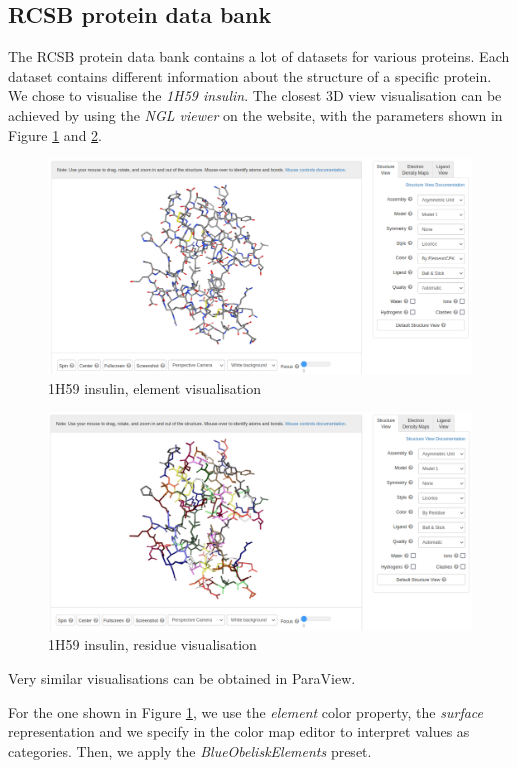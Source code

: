 \documentclass[openany]{article}
\begin{document}
\subsection {RCSB protein data bank}

The RCSB protein data bank contains a lot of datasets for various proteins. Each dataset contains different information about the structure of a specific protein. We chose to visualise the \textit{1H59 insulin}. The closest 3D view visualisation can be achieved by using the \textit{NGL viewer} on the website, with the parameters shown in Figure \ref{insulin_el} and \ref{insulin_res}.

\begin{figure} [h!]
	\centering
	\includegraphics[width=0.8\linewidth]{Proteins/1h59_insulin_el}
	\caption{1H59 insulin, element visualisation}
	\label{insulin_el}
\end{figure}

\begin{figure} [h!]
	\centering
	\includegraphics[width=0.8\linewidth]{Proteins/1h59_insulin_res}
	\caption{1H59 insulin, residue visualisation}
	\label{insulin_res}
\end{figure}

Very similar visualisations can be obtained in ParaView.

For the one shown in Figure \ref{insulin_el}, we use the \textit{element} color property, the \textit{surface} representation and we specify in the color map editor to interpret values as categories. Then, we apply the \textit{BlueObeliskElements} preset.
\end{document}
